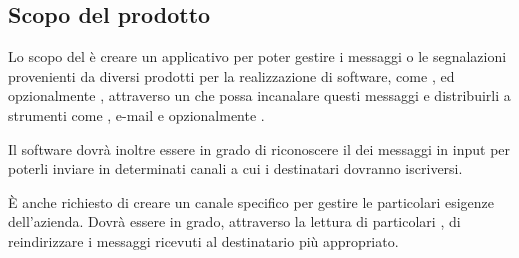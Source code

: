 \subsection{Scopo del prodotto}



Lo scopo del  è creare un applicativo per poter gestire i messaggi o le segnalazioni provenienti da diversi prodotti per la realizzazione di software,
come ,  ed opzionalmente , attraverso un  che possa incanalare questi messaggi e distribuirli a strumenti come
, e-mail e opzionalmente .\par
Il software dovrà inoltre essere in grado di riconoscere il  dei messaggi in input per poterli inviare in determinati canali a cui i
destinatari dovranno iscriversi.\par
\`E anche richiesto di creare un canale specifico per gestire le particolari esigenze dell'azienda. Dovrà essere in grado, attraverso la lettura di
particolari	, di reindirizzare i messaggi ricevuti al destinatario più appropriato.




